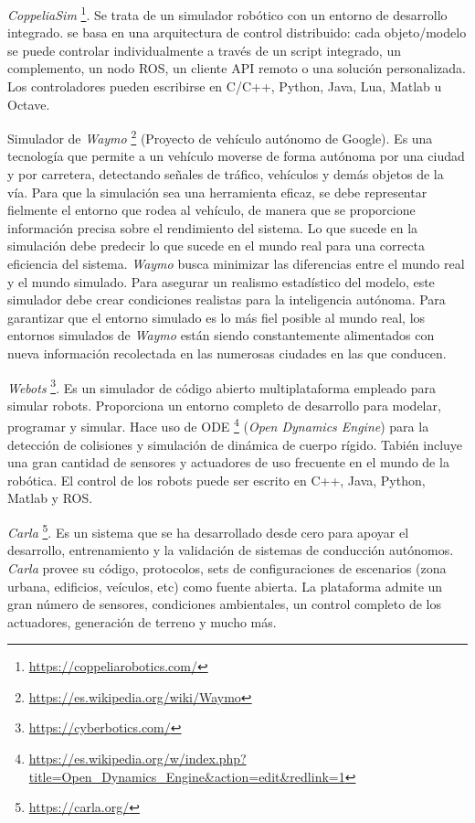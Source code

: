 \documentclass[a4paper, 12pt]{book}
\begin{document}
\emph{CoppeliaSim} \footnote{\url{https://coppeliarobotics.com/}}. Se trata de un simulador robótico con un entorno de desarrollo integrado. se basa en una arquitectura de control distribuido: cada objeto/modelo se puede controlar individualmente a través de un script integrado, un complemento, un nodo ROS, un cliente API remoto o una solución personalizada. Los controladores pueden escribirse en  C/C++, Python, Java, Lua, Matlab u Octave.

Simulador de \emph{Waymo} \footnote{\url{https://es.wikipedia.org/wiki/Waymo}} (Proyecto de vehículo autónomo de Google). Es una tecnología que permite a un vehículo moverse de forma autónoma por una ciudad y por carretera, detectando señales de tráfico, vehículos y demás objetos de la vía. Para que la simulación sea una herramienta eficaz, se debe representar fielmente el entorno que rodea al vehículo, de manera que se proporcione información precisa sobre el rendimiento del sistema. Lo que sucede en la simulación debe predecir lo que sucede en el mundo real para una correcta eficiencia del sistema. \emph{Waymo} busca minimizar las diferencias entre el mundo real y el mundo simulado. Para asegurar un realismo estadístico del modelo, este simulador debe crear condiciones realistas para la inteligencia autónoma. Para garantizar que el entorno simulado es lo más fiel posible al mundo real, los entornos simulados de  \emph{Waymo} están siendo constantemente alimentados con nueva información recolectada en las numerosas ciudades en las que conducen.

\emph{Webots} \footnote{\url{https://cyberbotics.com/}}. Es un simulador de código abierto multiplataforma empleado para simular robots. Proporciona un entorno completo de desarrollo para modelar, programar y simular. Hace uso de ODE \footnote{\url{https://es.wikipedia.org/w/index.php?title=Open_Dynamics_Engine&action=edit&redlink=1}} (\emph{Open Dynamics Engine}) para la detección de colisiones y simulación de dinámica de cuerpo rígido. Tabién incluye una gran cantidad de sensores y actuadores de uso frecuente en el mundo de la robótica. El control de los robots puede ser escrito en C++, Java, Python, Matlab y ROS.

\emph{Carla} \footnote{\url{https://carla.org/}}. Es un sistema que se ha desarrollado desde cero para apoyar el desarrollo, entrenamiento y la validación de sistemas de conducción autónomos. \emph{Carla} provee su código, protocolos, sets de configuraciones de escenarios (zona urbana, edificios, veículos, etc) como fuente abierta. La plataforma admite un gran número de sensores, condiciones ambientales, un control completo de los actuadores, generación de terreno y mucho más.
\end{document}
